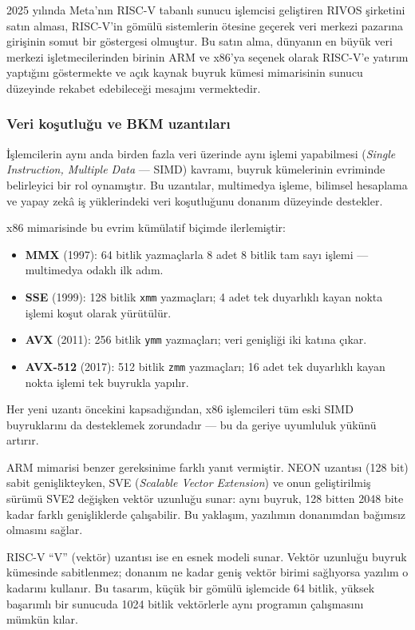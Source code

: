 2025 yılında Meta'nın RISC-V tabanlı sunucu işlemcisi geliştiren RIVOS şirketini satın alması, RISC-V'in gömülü sistemlerin ötesine geçerek veri merkezi pazarına girişinin somut bir göstergesi olmuştur. Bu satın alma, dünyanın en büyük veri merkezi işletmecilerinden birinin ARM ve x86'ya seçenek olarak RISC-V'e yatırım yaptığını göstermekte ve açık kaynak buyruk kümesi mimarisinin sunucu düzeyinde rekabet edebileceği mesajını vermektedir.

\subsubsection*{Veri koşutluğu ve BKM uzantıları}
İşlemcilerin aynı anda birden fazla veri üzerinde aynı işlemi yapabilmesi (\emph{Single Instruction, Multiple Data} --- SIMD) kavramı, buyruk kümelerinin evriminde belirleyici bir rol oynamıştır. Bu uzantılar, multimedya işleme, bilimsel hesaplama ve yapay zekâ iş yüklerindeki veri koşutluğunu donanım düzeyinde destekler.

x86 mimarisinde bu evrim kümülatif biçimde ilerlemiştir:
\begin{itemize}[nosep]
\item \textbf{MMX} (1997): 64 bitlik yazmaçlarla 8 adet 8 bitlik tam sayı işlemi --- multimedya odaklı ilk adım.
\item \textbf{SSE} (1999): 128 bitlik \texttt{xmm} yazmaçları; 4 adet tek duyarlıklı kayan nokta işlemi koşut olarak yürütülür.
\item \textbf{AVX} (2011): 256 bitlik \texttt{ymm} yazmaçları; veri genişliği iki katına çıkar.
\item \textbf{AVX-512} (2017): 512 bitlik \texttt{zmm} yazmaçları; 16 adet tek duyarlıklı kayan nokta işlemi tek buyrukla yapılır.
\end{itemize}

Her yeni uzantı öncekini kapsadığından, x86 işlemcileri tüm eski SIMD buyruklarını da desteklemek zorundadır --- bu da geriye uyumluluk yükünü artırır.

ARM mimarisi benzer gereksinime farklı yanıt vermiştir. NEON uzantısı (128 bit) sabit genişlikteyken, SVE (\emph{Scalable Vector Extension}) ve onun geliştirilmiş sürümü SVE2 değişken vektör uzunluğu sunar: aynı buyruk, 128 bitten 2048 bite kadar farklı genişliklerde çalışabilir. Bu yaklaşım, yazılımın donanımdan bağımsız olmasını sağlar.

RISC-V ``V'' (vektör) uzantısı ise en esnek modeli sunar. Vektör uzunluğu buyruk kümesinde sabitlenmez; donanım ne kadar geniş vektör birimi sağlıyorsa yazılım o kadarını kullanır. Bu tasarım, küçük bir gömülü işlemcide 64 bitlik, yüksek başarımlı bir sunucuda 1024 bitlik vektörlerle aynı programın çalışmasını mümkün kılar.

